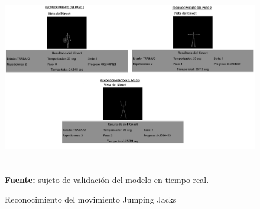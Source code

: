 \begin{figure}[H]
	\caption{Reconocimiento del movimiento Jumping Jacks}
	\label{fig:recognitionCheerleader}
	\centering
	\includegraphics[width=430px,height=320px]{graphics/resultados/recognitionCheerleader.png} \\
	\textbf{Fuente:} sujeto de validaci\'on del modelo en tiempo real.
\end{figure}
